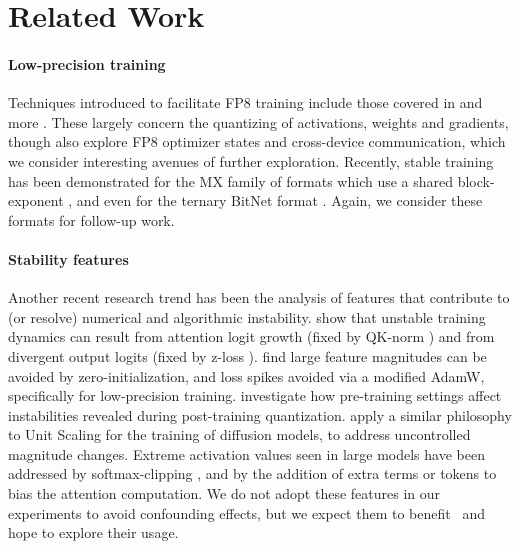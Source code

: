 \section{Related Work}

\paragraph{Low-precision training}

Techniques introduced to facilitate FP8 training include those covered in  and more \citep{Training_And_Inference_Using_8_Bit,DNNs_With_8_Bit,Mixed_Precision_8_Bit}. These largely concern the quantizing of activations, weights and gradients, though \citep{FP8-LM} also explore FP8 optimizer states and cross-device communication, which we consider interesting avenues of further exploration. Recently, stable training has been demonstrated for the MX family of formats which use a shared block-exponent \citep{MX1,MX2}, and even for the ternary BitNet format \citep{BitNet1,BitNet2,BitNet3}. Again, we consider these formats for follow-up work.

\paragraph{Stability features}

Another recent research trend has been the analysis of features that contribute to (or resolve) numerical and algorithmic instability. \citep{Small_Scale_Proxies} show that unstable training dynamics can result from attention logit growth (fixed by QK-norm \citep{Scaling_Vision_Transformers}) and from divergent output logits (fixed by z-loss \citep{Palm}). \citep{Stable_And_Low_Precision_Training} find large feature magnitudes can be avoided by zero-initialization, and loss spikes avoided via a modified AdamW, specifically for low-precision training. \citep{Intriguing_Properties} investigate how pre-training settings affect instabilities revealed during post-training quantization. \citep{Dynamics_Of_Diffusion_Models} apply a similar philosophy to Unit Scaling for the training of diffusion models, to address uncontrolled magnitude changes. Extreme activation values seen in large models \citep{LLM_INT8,SmoothQuant} have been addressed by softmax-clipping \citep{Quantizable_Transformers}, and by the addition of extra terms \citep{Massive_Activations} or tokens \citep{Vision_Transformers_Need_Registers} to bias the attention computation. We do not adopt these features in our experiments to avoid confounding effects, but we expect them to benefit \umup\ and hope to explore their usage.

